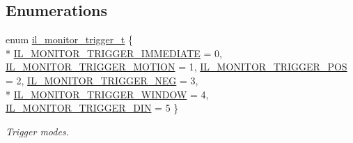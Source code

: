 \subsection*{Enumerations}
\begin{DoxyCompactItemize}
\item 
enum \hyperlink{group__IL__MONITOR_ga713d0c15082ee67cb77d384d4537e107}{il\+\_\+monitor\+\_\+trigger\+\_\+t} \{ \\*
\hyperlink{group__IL__MONITOR_gga713d0c15082ee67cb77d384d4537e107a7a2adbfffa9d5301d44c58aee1524947}{I\+L\+\_\+\+M\+O\+N\+I\+T\+O\+R\+\_\+\+T\+R\+I\+G\+G\+E\+R\+\_\+\+I\+M\+M\+E\+D\+I\+A\+TE} = 0, 
\hyperlink{group__IL__MONITOR_gga713d0c15082ee67cb77d384d4537e107a3d9776dc06a1769bb3bac474d0d2f671}{I\+L\+\_\+\+M\+O\+N\+I\+T\+O\+R\+\_\+\+T\+R\+I\+G\+G\+E\+R\+\_\+\+M\+O\+T\+I\+ON} = 1, 
\hyperlink{group__IL__MONITOR_gga713d0c15082ee67cb77d384d4537e107a3e127c86c21f607d0df72b64403adb42}{I\+L\+\_\+\+M\+O\+N\+I\+T\+O\+R\+\_\+\+T\+R\+I\+G\+G\+E\+R\+\_\+\+P\+OS} = 2, 
\hyperlink{group__IL__MONITOR_gga713d0c15082ee67cb77d384d4537e107afff4584d639834baa2242e2ab08aafd6}{I\+L\+\_\+\+M\+O\+N\+I\+T\+O\+R\+\_\+\+T\+R\+I\+G\+G\+E\+R\+\_\+\+N\+EG} = 3, 
\\*
\hyperlink{group__IL__MONITOR_gga713d0c15082ee67cb77d384d4537e107af66901be0c630d815042a98f13b0781b}{I\+L\+\_\+\+M\+O\+N\+I\+T\+O\+R\+\_\+\+T\+R\+I\+G\+G\+E\+R\+\_\+\+W\+I\+N\+D\+OW} = 4, 
\hyperlink{group__IL__MONITOR_gga713d0c15082ee67cb77d384d4537e107aededed6d0aa1e43dd19b0019f857db06}{I\+L\+\_\+\+M\+O\+N\+I\+T\+O\+R\+\_\+\+T\+R\+I\+G\+G\+E\+R\+\_\+\+D\+IN} = 5
 \}\begin{DoxyCompactList}\small\item\em Trigger modes. \end{DoxyCompactList}
\end{DoxyCompactItemize}
